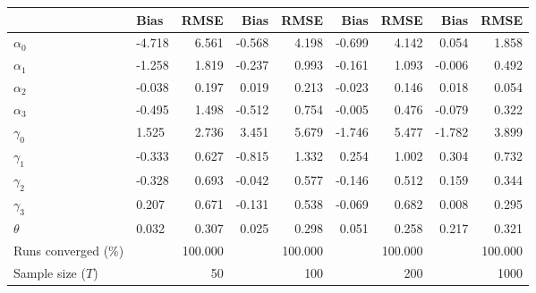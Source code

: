 
\begin{tabular}[t]{llrrrrrrr}
\toprule
  & Bias & RMSE & Bias & RMSE & Bias & RMSE & Bias & RMSE\\
\midrule
$\alpha_{0}$ & -4.718 & 6.561 & -0.568 & 4.198 & -0.699 & 4.142 & 0.054 & 1.858\\
$\alpha_{1}$ & -1.258 & 1.819 & -0.237 & 0.993 & -0.161 & 1.093 & -0.006 & 0.492\\
$\alpha_{2}$ & -0.038 & 0.197 & 0.019 & 0.213 & -0.023 & 0.146 & 0.018 & 0.054\\
$\alpha_{3}$ & -0.495 & 1.498 & -0.512 & 0.754 & -0.005 & 0.476 & -0.079 & 0.322\\
$\gamma_{0}$ & 1.525 & 2.736 & 3.451 & 5.679 & -1.746 & 5.477 & -1.782 & 3.899\\
$\gamma_{1}$ & -0.333 & 0.627 & -0.815 & 1.332 & 0.254 & 1.002 & 0.304 & 0.732\\
$\gamma_{2}$ & -0.328 & 0.693 & -0.042 & 0.577 & -0.146 & 0.512 & 0.159 & 0.344\\
$\gamma_{3}$ & 0.207 & 0.671 & -0.131 & 0.538 & -0.069 & 0.682 & 0.008 & 0.295\\
$\theta$ & 0.032 & 0.307 & 0.025 & 0.298 & 0.051 & 0.258 & 0.217 & 0.321\\
Runs converged (\%) &  & 100.000 &  & 100.000 &  & 100.000 &  & 100.000\\
Sample size ($T$) &  & 50 &  & 100 &  & 200 &  & 1000\\
\bottomrule
\end{tabular}
